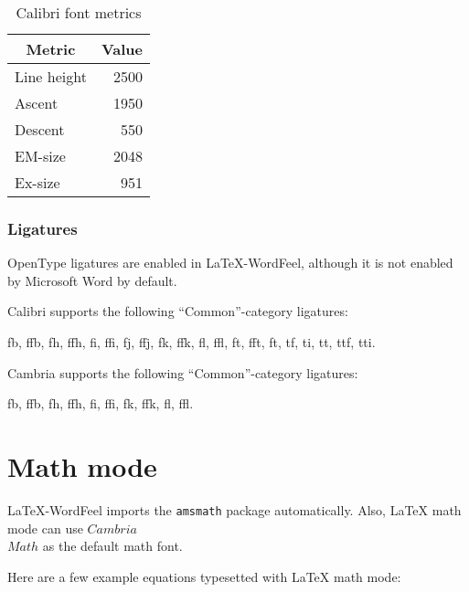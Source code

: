 \documentclass[letterpaper]{wordfeel}
\begin{document}
\begin{table}[htb]
    \centering
    \caption{Calibri font metrics}
    \label{tab:font-metrics}
    \begin{tabular}{lr}
        \toprule
        \multicolumn{1}{c}{Metric} & \multicolumn{1}{c}{Value}\\
        \midrule
        Line height & 2500 \\
        Ascent & 1950 \\
        Descent & 550 \\
        EM-size & 2048 \\
        Ex-size & 951 \\
        \bottomrule
    \end{tabular}
\end{table}

\FloatBarrier

\subsubsection{Ligatures}

OpenType ligatures are enabled in \LaTeX-WordFeel, although it is not enabled by Microsoft Word by default.

Calibri supports the following ``Common''-category ligatures:

{\LARGE fb, ffb, fh, ffh, fi, ffi, fj, ffj, fk, ffk, fl, ffl, ft, fft, ft, tf, ti, tt, ttf, tti.}

\textrm{Cambria} supports the following ``Common''-category ligatures:

{\LARGE\rmfamily fb, ffb, fh, ffh, fi, ffi, fk, ffk, fl, ffl.}

\section{Math mode}

\LaTeX-WordFeel imports the \texttt{amsmath} package automatically. Also, \LaTeX{} math mode can use \(Cambria\)\\\(Math\) as the default math font.

Here are a few example equations typesetted with \LaTeX{} math mode:
\end{document}
